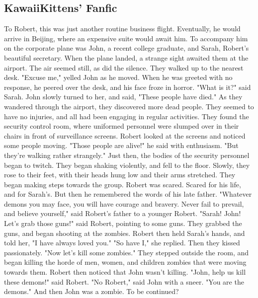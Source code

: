\documentclass[a4paper]{article}
\begin{document}
\subsection{KawaiiKittens' Fanfic}
To Robert, this was just another routine business flight. Eventually, he would arrive in Beijing, where an expensive suite would await him.
To accompany him on the corporate plane was John, a recent college graduate, and Sarah, Robert's beautiful secretary.
When the plane landed, a strange sight awaited them at the airport. The air seemed still, as did the silence. They walked up to the nearest desk. "Excuse me," yelled John as he moved.
When he was greeted with no response, he peered over the desk, and his face froze in horror. "What is it?" said Sarah.
John slowly turned to her, and said, "These people have died."
As they wandered through the airport, they discovered more dead people. They seemed to have no injuries, and all had been engaging in regular activities.
They found the security control room, where uniformed personnel were slumped over in their chairs in front of surveillance screens. Robert looked at the screens and noticed some people moving. "Those people are alive!" he said with enthusiasm. "But they're walking rather strangely."
Just then, the bodies of the security personnel began to twitch. They began shaking violently, and fell to the floor. Slowly, they rose to their feet, with their heads hung low and their arms stretched. They began making steps towards the group.
Robert was scared. Scared for his life, and for Sarah's. But then he remembered the words of his late father. "Whatever demons you may face, you will have courage and bravery. Never fail to prevail, and believe yourself," said Robert's father to a younger Robert.
"Sarah! John! Let's grab those guns!" said Robert, pointing to some guns. They grabbed the guns, and began shooting at the zombies.
Robert then held Sarah's hands, and told her, "I have always loved you."
"So have I," she replied. Then they kissed passionately. "Now let's kill some zombies."
They stepped outside the room, and began killing the horde of men, women, and children zombies that were moving towards them. Robert then noticed that John wasn't killing.
"John, help us kill these demons!" said Robert.
"No Robert," said John with a sneer. "You are the demons."
And then John was a zombie.
To be continued?
\end{document}
